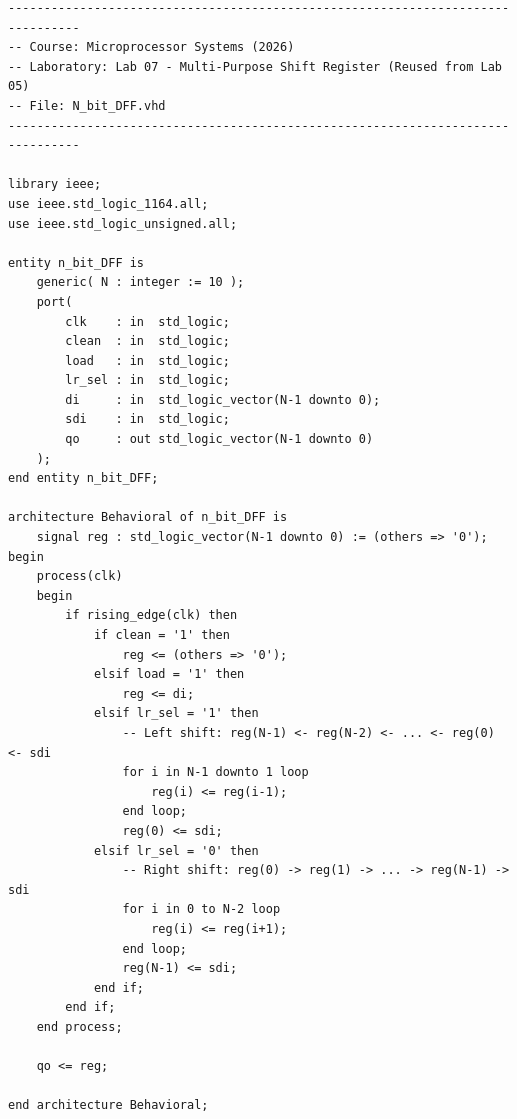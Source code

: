 \documentclass[12pt, a4paper]{article}
\begin{document}
\begin{lstlisting}[style=vhdlstyle, caption={N\_bit\_DFF.vhd --- 泛用 N-bit 移位暫存器元件（重用自 Lab 05）}]
--------------------------------------------------------------------------------
-- Course: Microprocessor Systems (2026)
-- Laboratory: Lab 07 - Multi-Purpose Shift Register (Reused from Lab 05)
-- File: N_bit_DFF.vhd
--------------------------------------------------------------------------------

library ieee;
use ieee.std_logic_1164.all;
use ieee.std_logic_unsigned.all;

entity n_bit_DFF is
    generic( N : integer := 10 );
    port(
        clk    : in  std_logic;
        clean  : in  std_logic;
        load   : in  std_logic;
        lr_sel : in  std_logic;
        di     : in  std_logic_vector(N-1 downto 0);
        sdi    : in  std_logic;
        qo     : out std_logic_vector(N-1 downto 0)
    );
end entity n_bit_DFF;

architecture Behavioral of n_bit_DFF is
    signal reg : std_logic_vector(N-1 downto 0) := (others => '0');
begin
    process(clk)
    begin
        if rising_edge(clk) then
            if clean = '1' then
                reg <= (others => '0');
            elsif load = '1' then
                reg <= di;
            elsif lr_sel = '1' then
                -- Left shift: reg(N-1) <- reg(N-2) <- ... <- reg(0) <- sdi
                for i in N-1 downto 1 loop
                    reg(i) <= reg(i-1);
                end loop;
                reg(0) <= sdi;
            elsif lr_sel = '0' then
                -- Right shift: reg(0) -> reg(1) -> ... -> reg(N-1) -> sdi
                for i in 0 to N-2 loop
                    reg(i) <= reg(i+1);
                end loop;
                reg(N-1) <= sdi;
            end if;
        end if;
    end process;

    qo <= reg;

end architecture Behavioral;
\end{lstlisting}
\end{document}
